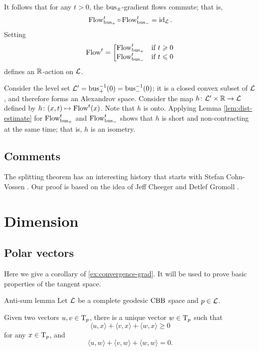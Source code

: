 It follows that for any $t>0$, the $\operatorname{\rm bus}\nolimits_\pm$-gradient flows commute;
that is, 
\[\mathop{\rm Flow}\nolimits_{\operatorname{\rm bus}\nolimits_+}^t\circ\mathop{\rm Flow}\nolimits_{\operatorname{\rm bus}\nolimits_-}^t=\operatorname{\rm id}\nolimits_{\mathcal{L}}.\]
Setting
\[\mathop{\rm Flow}\nolimits^t=\left[\begin{matrix}
\mathop{\rm Flow}\nolimits_{\operatorname{\rm bus}\nolimits_+}^t&\hbox{if}\ t\geqslant0\\
\mathop{\rm Flow}\nolimits_{\operatorname{\rm bus}\nolimits_-}^t&\hbox{if}\ t\leqslant0
               \end{matrix}\right.\]
defines an $\mathbb{R}$-action on $\mathcal{L}$.

Consider the level set $\mathcal{L}'=\operatorname{\rm bus}\nolimits_+^{-1}(0)=\operatorname{\rm bus}\nolimits_-^{-1}(0)$;
it is a closed convex subset of $\mathcal{L}$, and therefore forms an Alexandrov space.
Consider the map $h\colon\mathcal{L}'\times \mathbb{R}\to \mathcal{L}$ defined by $h\colon(x,t)\mapsto \mathop{\rm Flow}\nolimits^t(x)$.
Note that $h$ is onto.
Applying Lemma \ref{lem:dist-estimate} for $\mathop{\rm Flow}\nolimits_{\operatorname{\rm bus}\nolimits_+}^t$ and $\mathop{\rm Flow}\nolimits_{\operatorname{\rm bus}\nolimits_-}^t$ shows that $h$ is short and non-contracting at the same time; that is, $h$ is an isometry.
\qeds

\section{Comments}

The splitting theorem has an interesting history that starts with Stefan Cohn-Vossen \cite{cohn-vossen_line}.
Our proof is based on the idea of Jeff Cheeger and Detlef Gromoll \cite{cheeger-gromoll-split}.

\chapter{Dimension}

\section{Polar vectors}

Here we give a corollary of \ref{ex:convergence-grad}.
It will be used to prove basic properties of the tangent space.


\begin{thm}{Anti-sum lemma}\label{lem:minus-sum} 
Let $\mathcal{L}$ be a complete geodesic $\mathrm{CBB}$ space and $p\in \mathcal{L}$.

Given two vectors $u,v\in \mathrm{T}_p$, there is a unique vector $w\in \mathrm{T}_p$ such that
\[\langle u,x\rangle +\langle v,x\rangle +\langle w,x\rangle \ge 0\]
for any $x\in \mathrm{T}_p$, and
\[\langle u,w\rangle +\langle v,w\rangle +\langle w,w\rangle =0.\]

\end{thm}

